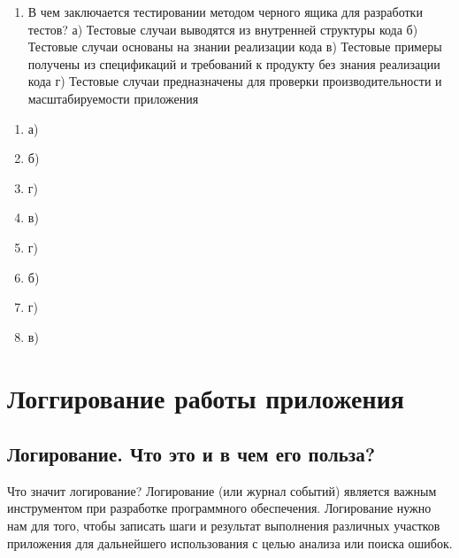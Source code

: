 \documentclass[letterpaper,10pt,russian]{sphinxmanual}
\begin{document}
\begin{enumerate}
\item {} 
\sphinxAtStartPar
В чем заключается тестировании методом черного ящика для разработки тестов?
а) Тестовые случаи выводятся из внутренней структуры кода
б) Тестовые случаи основаны на знании реализации кода
в) Тестовые примеры получены из спецификаций и требований к продукту без знания реализации кода
г) Тестовые случаи предназначены для проверки производительности и масштабируемости приложения

\end{enumerate}

\sphinxAtStartPar
{}
\begin{enumerate}
%
\item {} 
\sphinxAtStartPar
а)

\item {} 
\sphinxAtStartPar
б)

\item {} 
\sphinxAtStartPar
г)

\item {} 
\sphinxAtStartPar
в)

\item {} 
\sphinxAtStartPar
г)

\item {} 
\sphinxAtStartPar
б)

\item {} 
\sphinxAtStartPar
г)

\item {} 
\sphinxAtStartPar
в)

\end{enumerate}


\chapter{Логгирование работы приложения}
\label{\detokenize{index:id14}}
\sphinxstepscope


\section{Логирование. Что это и в чем его польза?}
\label{\detokenize{educational_materials/logging/content:id1}}\label{\detokenize{educational_materials/logging/content::doc}}
\sphinxAtStartPar
Что значит логирование? Логирование (или журнал событий) является важным инструментом при разработке программного обеспечения. Логирование нужно нам для того, чтобы записать шаги и результат выполнения различных участков приложения для дальнейшего использования с целью анализа или поиска ошибок.
\end{document}
